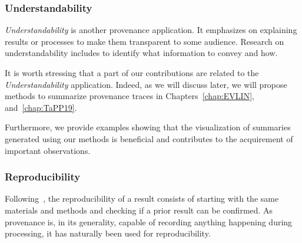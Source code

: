 \subsubsection{Understandability}
\emph{Understandability} is another provenance application. It emphasizes on explaining results or processes to make them transparent to some audience. Research on understandability includes to identify what information to convey and how. 

It is worth stressing that a part of our contributions are related to the \emph{Understandability} application. 
Indeed, as we will discuss later, we will propose methods to summarize provenance traces in Chapters~\ref{chap:EVLIN}, and~\ref{chap:TaPP19}. 
{\color{Fuchsia}Furthermore, we provide examples showing that the visualization of summaries generated using our methods is beneficial and contributes to the acquirement of important observations. 


}








\subsubsection{Reproducibility}

Following~\cite{Moreau2011}, the reproducibility of a result consists of starting with the same materials and methods and checking if a prior result can be confirmed. As provenance is, in its generality, capable of recording anything happening during processing, it has naturally been used for reproducibility. 

